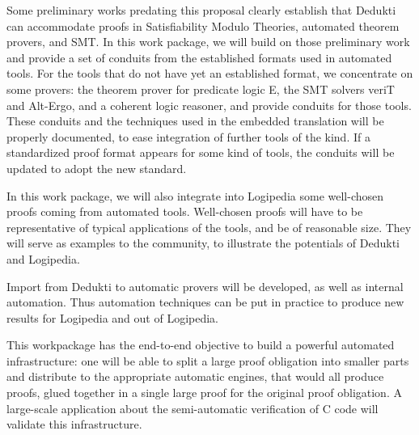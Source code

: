 \begin{workpackage}
\begin{wpdescription}
Some preliminary works predating this proposal clearly establish that
Dedukti can accommodate proofs in Satisfiability Modulo Theories,
automated theorem provers, and SMT. In this work package, we will build
on those preliminary work and provide a set of conduits from the
established formats used in automated tools. For the tools that do not
have yet an established format, we concentrate on some provers: the
theorem prover for predicate logic E, the SMT solvers veriT and Alt-Ergo, and a
coherent logic reasoner, and provide conduits for those tools. These
conduits and the techniques used in the embedded translation will be
properly documented, to ease integration of further tools of the kind.
If a standardized proof format appears for some kind of tools, the
conduits will be updated to adopt the new standard.

In this work package, we will also integrate into Logipedia some well-chosen
proofs coming from automated tools.  Well-chosen proofs will have to be
representative of typical applications of the tools, and be of reasonable size.
They will serve as examples to the community, to illustrate the potentials of
Dedukti and Logipedia.

Import from Dedukti to automatic provers will be developed, as well as
internal automation. Thus automation techniques can be put in practice to
produce new results for Logipedia and out of Logipedia.

This workpackage has the end-to-end objective to build a powerful automated
infrastructure: one will be able to split a large proof obligation into smaller
parts and distribute to the appropriate automatic engines, that would all
produce proofs, glued together in a single large proof for the original proof
obligation. A large-scale application about the semi-automatic verification of C
code will validate this infrastructure.
\end{wpdescription}


\begin{tasklist}
  \begin{task}[id=instrumenting,
      title=Instrumenting ATPs to produce traces,
      lead=Lie,
      LieRM=31,
      ImtRM=1,
      OcaRM=12,
      BelRM=6,
      StuRM=1,
      wphases=1-48!1.0
    ]


\end{task}
\end{tasklist}
\end{workpackage}
